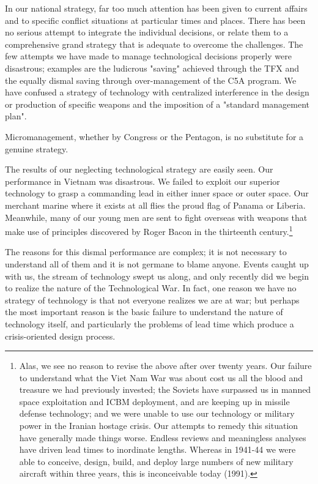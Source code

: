 In our national strategy, far too much attention has been given to current affairs and to specific conflict situations at particular times and places. There has been no serious attempt to integrate the individual decisions, or relate them to a comprehensive grand strategy that is adequate to overcome the challenges. The few attempts we have made to manage technological decisions properly were disastrous; examples are the ludicrous "saving" achieved through the TFX and the equally dismal saving through over-management of the C5A program. We have confused a strategy of technology with centralized interference in the design or production of specific weapons and the imposition of a "standard management plan".

Micromanagement, whether by Congress or the Pentagon, is no substitute for a genuine strategy.

The results of our neglecting technological strategy are easily seen. Our performance in Vietnam was disastrous. We failed to exploit our superior technology to grasp a commanding lead in either inner space or outer space. Our merchant marine where it exists at all flies the proud flag of Panama or Liberia. Meanwhile, many of our young men are sent to fight overseas with weapons that make use of principles discovered by Roger Bacon in the thirteenth century.\footnote{
Alas, we see no reason to revise the above after over twenty years. Our failure to understand what the Viet Nam War was about cost us all the blood and treasure we had previously invested; the Soviets have surpassed us in manned space exploitation and ICBM deployment, and are keeping up in missile defense technology; and we were unable to use our technology or military power in the Iranian hostage crisis.
Our attempts to remedy this situation have generally made things worse. Endless reviews and meaningless analyses have driven lead times to inordinate lengths. Whereas in 1941-44 we were able to conceive, design, build, and deploy large numbers of new military aircraft within three years, this is inconceivable today (1991).}

The reasons for this dismal performance are complex; it is not necessary to understand all of them and it is not germane to blame anyone. Events caught up with us, the stream of technology swept us along, and only recently did we begin to realize the nature of the Technological War. In fact, one reason we have no strategy of technology is that not everyone realizes we are at war; but perhaps the most important reason is the basic failure to understand the nature of technology itself, and particularly the problems of lead time which produce a crisis-oriented design process.

